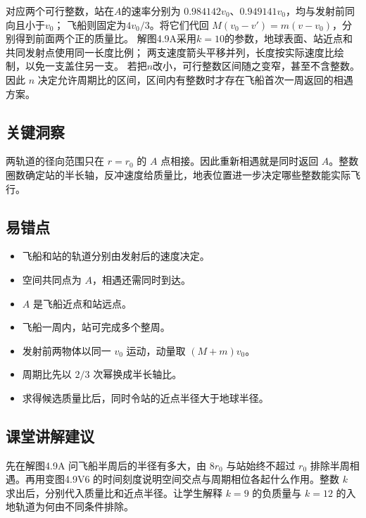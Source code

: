 \documentclass[UTF8,fontset=fandol,a4paper,11pt]{ctexart}
\begin{document}
对应两个可行整数，站在$A$的速率分别为
$0.984142v_0$、$0.949141v_0$，均与发射前同向且小于$v_0$；
飞船则固定为$4v_0/3$。将它们代回
$M(v_0-v')=m(v-v_0)$，分别得到前面两个正的质量比。
解图4.9A采用$k=10$的参数，地球表面、站近点和共同发射点使用同一长度比例；
两支速度箭头平移并列，长度按实际速度比绘制，以免一支盖住另一支。
若把$n$改小，可行整数区间随之变窄，甚至不含整数。
因此 $n$ 决定允许周期比的区间，区间内有整数时才存在飞船首次一周返回的相遇方案。




\subsection*{关键洞察}

两轨道的径向范围只在 $r=r_0$ 的 $A$ 点相接。因此重新相遇就是同时返回 $A$。整数圈数确定站的半长轴，反冲速度给质量比，地表位置进一步决定哪些整数能实际飞行。



\subsection*{易错点}

\begin{itemize}
\item 飞船和站的轨道分别由发射后的速度决定。
\item 空间共同点为 $A$，相遇还需同时到达。
\item $A$ 是飞船近点和站远点。
\item 飞船一周内，站可完成多个整周。
\item 发射前两物体以同一 $v_0$ 运动，动量取 $(M+m)v_0$。
\item 周期比先以 $2/3$ 次幂换成半长轴比。
\item 求得候选质量比后，同时令站的近点半径大于地球半径。
\end{itemize}



\subsection*{课堂讲解建议}

先在解图4.9A 问飞船半周后的半径有多大，由 $8r_0$ 与站始终不超过 $r_0$ 排除半周相遇。再用变图4.9V6 的时间刻度说明空间交点与周期相位各起什么作用。整数 $k$ 求出后，分别代入质量比和近点半径。让学生解释 $k=9$ 的负质量与 $k=12$ 的入地轨道为何由不同条件排除。
\end{document}
